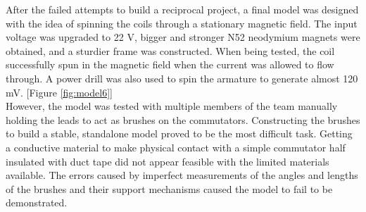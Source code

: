     \noindent
    After the failed attempts to build a reciprocal project, a final model was designed with the idea of spinning the coils through a stationary magnetic field. The input voltage was upgraded to 22 V, bigger and stronger N52 neodymium magnets were obtained, and a sturdier frame was constructed. When being tested, the coil successfully spun in the magnetic field when the current was allowed to flow through. A power drill was also used to spin the armature to generate almost 120 mV. [Figure \ref{fig:model6}]\\

    \noindent
    However, the model was tested with multiple members of the team manually holding the leads to act as brushes on the commutators. Constructing the brushes to build a stable, standalone model proved to be the most difficult task. Getting a conductive material to make physical contact with a simple commutator half insulated with duct tape did not appear feasible with the limited materials available. The errors caused by imperfect measurements of the angles and lengths of the brushes and their support mechanisms caused the model to fail to be demonstrated.

\clearpage
